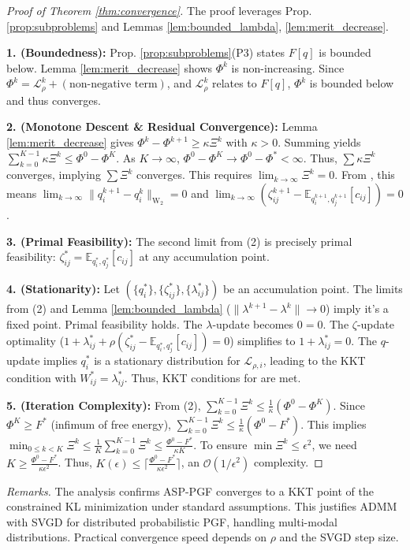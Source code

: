 \begin{proof}[Proof of Theorem \ref{thm:convergence}]
The proof leverages Prop. \ref{prop:subproblems} and Lemmas \ref{lem:bounded_lambda}, \ref{lem:merit_decrease}.

\textbf{1. (Boundedness):} Prop. \ref{prop:subproblems}(P3) states $F[q]$ is bounded below. Lemma \ref{lem:merit_decrease} shows $\Phi^k$ is non-increasing. Since $\Phi^k = {\mathcal{L}}_{\rho}^k + (\text{non-negative term})$, and ${\mathcal{L}}_{\rho}^k$ relates to $F[q]$, $\Phi^k$ is bounded below and thus converges.

\textbf{2. (Monotone Descent & Residual Convergence):} Lemma \ref{lem:merit_decrease} gives $\Phi^k - \Phi^{k+1} \ge \kappa \Xi^k$ with $\kappa > 0$. Summing yields $\sum_{k=0}^{K-1} \kappa \Xi^k \le \Phi^0 - \Phi^K$. As $K \to \infty$, $\Phi^0 - \Phi^K \to \Phi^0 - \Phi^* < \infty$. Thus, $\sum \kappa \Xi^k$ converges, implying $\sum \Xi^k$ converges. This requires $\lim_{k \to \infty} \Xi^k = 0$. From , this means $\lim_{k \to \infty} \|q_i^{k+1} - q_i^k\|_{\text{W}_2} = 0$ and $\lim_{k \to \infty} (\zeta_{ij}^{k+1} - \mathbb{E}_{q_i^{k+1}, q_j^{k+1}}[c_{ij}]) = 0$.

\textbf{3. (Primal Feasibility):} The second limit from (2) is precisely primal feasibility: $\zeta_{ij}^* = \mathbb{E}_{q_i^*, q_j^*}[c_{ij}]$ at any accumulation point.

\textbf{4. (Stationarity):} Let $(\{q_i^*\}, \{\zeta_{ij}^*\}, \{\lambda_{ij}^*\})$ be an accumulation point. The limits from (2) and Lemma \ref{lem:bounded_lambda} ($\|\lambda^{k+1}-\lambda^k\| \to 0$) imply it's a fixed point.
Primal feasibility holds. The $\lambda$-update  becomes $0=0$. The $\zeta$-update optimality ($1 + \lambda_{ij}^* + \rho (\zeta_{ij}^* - \mathbb{E}_{q_i^*, q_j^*}[c_{ij}]) = 0$) simplifies to $1 + \lambda_{ij}^* = 0$.
The $q$-update  implies $q_i^*$ is a stationary distribution for ${\mathcal{L}}_{\rho, i}$, leading to the KKT condition  with $W_{ij}^* = \lambda_{ij}^*$. Thus, KKT conditions for  are met.

\textbf{5. (Iteration Complexity):} From (2), $\sum_{k=0}^{K-1} \Xi^k \le \frac{1}{\kappa}(\Phi^0 - \Phi^K)$. Since $\Phi^K \ge F^*$ (infimum of free energy), $\sum_{k=0}^{K-1} \Xi^k \le \frac{1}{\kappa}(\Phi^0 - F^*)$.
This implies $\min_{0 \le k < K} \Xi^k \le \frac{1}{K} \sum_{k=0}^{K-1} \Xi^k \le \frac{\Phi^0 - F^*}{\kappa K}$.
To ensure $\min \Xi^k \le \epsilon^2$, we need $K \ge \frac{\Phi^0 - F^*}{\kappa \epsilon^2}$. Thus, $K(\epsilon) \le \lceil \frac{\Phi^0 - F^*}{\kappa \epsilon^2} \rceil$, an $\mathcal{O}(1/\epsilon^2)$ complexity.
\end{proof}
\vspace{2mm}

\textit{Remarks.} The analysis confirms ASP-PGF converges to a KKT point of the constrained KL minimization under standard assumptions. This justifies ADMM with SVGD for distributed probabilistic PGF, handling multi-modal distributions. Practical convergence speed depends on $\rho$ and the SVGD step size.
